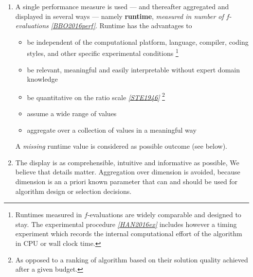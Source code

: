 \documentclass[letterpaper,12pt,english]{article}
\begin{document}
\begin{enumerate}
\item {} 
A single performance measure is used --- and thereafter aggregated and
displayed in
several ways --- namely \textbf{runtime}, \emph{measured in
number of} \(f\)-\emph{evaluations} \label{index:id12}{\hyperref[index:bbo2016perf]{\emph{{[}BBO2016perf{]}}}}. Runtime has the advantages to
\begin{itemize}
\item {} 
be independent of the computational platform, language, compiler, coding
styles, and other specific experimental conditions \footnote[4]{
Runtimes measured in \(f\)-evaluations are widely
comparable and designed to stay. The experimental procedure
\label{index:id19}{\hyperref[index:han2016ex]{\emph{{[}HAN2016ex{]}}}} includes however a timing experiment which records the
internal computational effort of the algorithm in CPU or wall clock time.
}

\item {} 
be relevant, meaningful and easily interpretable without expert domain knowledge

\item {} 
be quantitative on the ratio scale \label{index:id14}{\hyperref[index:ste1946]{\emph{{[}STE1946{]}}}} \footnote[5]{
As opposed to a ranking of algorithm based on their solution quality
achieved after a given budget.
}

\item {} 
assume a wide range of values

\item {} 
aggregate over a collection of values in a meaningful way

\end{itemize}

A \emph{missing} runtime value is considered as possible outcome (see below).

\item {} 
The display is as comprehensible, intuitive and informative as possible,
We believe that details matter.
Aggregation over dimension is avoided, because dimension is an a priori
known parameter that can and should be used for algorithm design or selection
decisions.

\end{enumerate}
\end{document}
